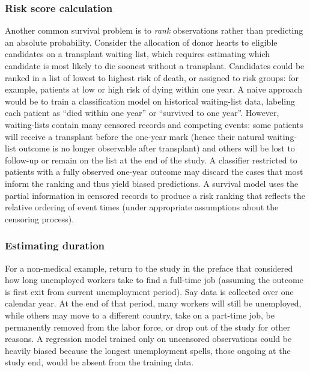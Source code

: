 \documentclass[
  letterpaper,
  krantz2]{style/krantz}
\begin{document}
\subsubsection*{Risk score calculation}\label{risk-score-calculation}

Another common survival problem is to \emph{rank} observations rather
than predicting an absolute probability. Consider
the allocation of donor hearts to eligible candidates on a transplant
waiting list, which requires estimating which candidate is most likely
to die soonest without a transplant. Candidates could be ranked in a
list of lowest to highest risk of death, or assigned to risk groups: for
example, patients at low or high risk of dying within one year. A naive
approach would be to train a classification model on historical
waiting-list data, labeling each patient as ``died within one year'' or
``survived to one year''. However, waiting-lists contain many censored
records and competing events: some patients will
receive a transplant before the one-year mark (hence their natural
waiting-list outcome is no longer observable after transplant) and
others will be lost to follow-up or remain on the list at the end of the
study. A classifier restricted to patients with a
fully observed one-year outcome may discard the cases that most inform
the ranking and thus yield biased predictions. A survival model uses the
partial information in censored records to produce a risk ranking that
reflects the relative ordering of event times (under appropriate
assumptions about the censoring process).

\subsubsection*{Estimating duration}\label{estimating-duration}

For a non-medical example, return to the study in the preface that
considered how long unemployed workers take to find a full-time job
(assuming the outcome is first exit from current unemployment period).
Say data is collected over one calendar year. At the end of that period,
many workers will still be unemployed, while others may move to a
different country, take on a part-time job, be permanently removed from
the labor force, or drop out of the study for other reasons. A
regression model trained only on uncensored
observations could be heavily biased because the longest unemployment
spells, those ongoing at the study end, would be absent from the
training data.
\end{document}
